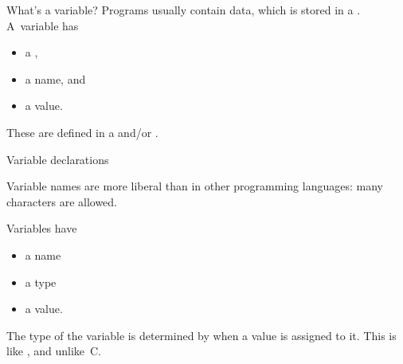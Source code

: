 \begin{slide}{What's a variable?}
  \label{sl:declaration}
  Programs usually contain data, which is stored in a
  . A~variable has
  \begin{itemize}
  \item a ,
  \item a name, and
  \item a value.
  \end{itemize}
  These are defined in a  and/or
  .
\end{slide}

\begin{comment}
  \begin{block}{Typical variable lifetime}
    \label{sl:varlife}
    \begin{lstlisting}
      int i,j; // declaration
      i = 5;   // set a value
      i = 6;   // set a new value
      j = i+1; // use the value of i
      i = 8; // change the value of i
      // but this doesn't affect j:
      // it is still 7.
    \end{lstlisting}
  \end{block}
\end{comment}

 {Variable declarations}

Variable names are more liberal than in other programming languages:
many  characters are allowed.

Variables have
\begin{itemize}
\item a name
\item a type
\item a value.
\end{itemize}
The type of the variable is determined by when a value is assigned to it.
This is like \jvp, and unlike~C.

